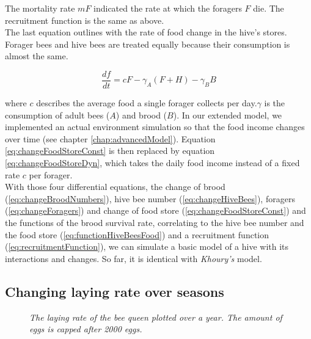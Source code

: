 	The mortality rate $mF$ indicated the rate at which the foragers $F$ die. The recruitment function is the same as above.\\	
	The last equation outlines with the rate of food change in the hive's stores. Forager bees and hive bees are treated equally because their consumption is almost the same. 
	
	\begin{equation}\label{eq:changeFoodStoreConst}
		\frac{df}{dt} = c F - \gamma_A (F+H) - \gamma_B B
	\end{equation}
	
	where $c$ describes the average food a single forager collects per day.$\gamma$ is the consumption of adult bees ($A$) and brood ($B$). In our extended model, we implemented an actual environment simulation so that the food income changes over time (see chapter \ref{chap:advancedModel}). Equation \ref{eq:changeFoodStoreConst} is then replaced by equation \ref{eq:changeFoodStoreDyn}, which takes the daily food income instead of a fixed rate $c$ per forager.\\
	
	With those four differential equations, the change of brood (\ref{eq:changeBroodNumbers}), hive bee number (\ref{eq:changeHiveBees}), foragers (\ref{eq:changeForagers}) and change of food store (\ref{eq:changeFoodStoreConst}) and the functions of the brood survival rate, correlating to the hive bee number and the food store (\ref{eq:functionHiveBeesFood}) and a recruitment function (\ref{eq:recruitmentFunction}), we can simulate a basic model of a hive with its interactions and changes. So far, it is identical with \textit{Khoury's} model.

	\subsection{Changing laying rate over seasons}
		\begin{figure}
			\centering
			\caption{\textit{The laying rate of the bee queen plotted over a year. The amount of eggs is capped after 2000 eggs. }}
			\label{fig:dynLayingRate}
		\end{figure}
		
